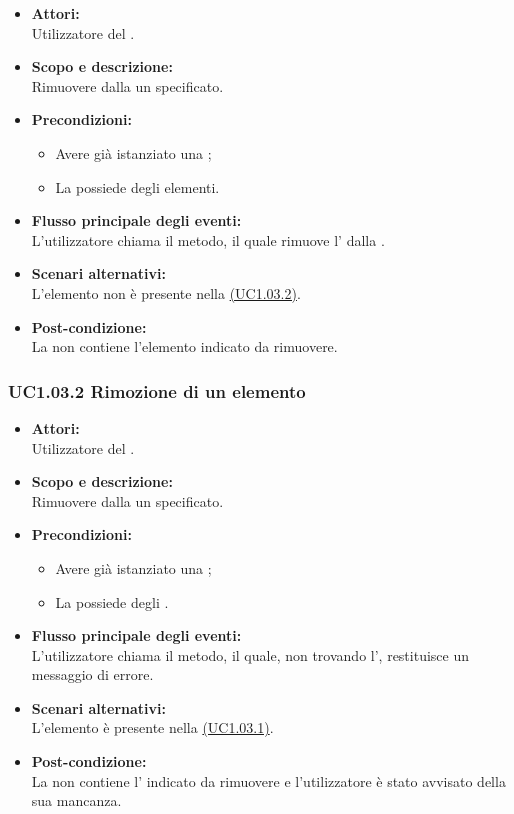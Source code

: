 \begin{itemize}
	\item \textbf{Attori:}
	\\Utilizzatore del .
	\item \textbf{Scopo e descrizione:} 
	\\Rimuovere dalla  un  specificato.
	\item \textbf{Precondizioni:}
	\begin{itemize}
		\item Avere già istanziato una ;
		\item La  possiede degli elementi.
	\end{itemize}
	\item \textbf{Flusso principale degli eventi:}
	\\L'utilizzatore chiama il metodo, il quale rimuove l' dalla .
	\item \textbf{Scenari alternativi:}
	\\L'elemento non è presente nella  \hyperref[UC1.03.2]{(UC1.03.2)}.
	\item \textbf{Post-condizione:}
	\\La {} non contiene l'elemento indicato da rimuovere.
\end{itemize}

\subsubsection{UC1.03.2 Rimozione di un elemento} \label{UC1.03.2}

\begin{itemize}
	\item \textbf{Attori:}
	\\Utilizzatore del .
	\item \textbf{Scopo e descrizione:} 
	\\Rimuovere dalla  un  specificato.
	\item \textbf{Precondizioni:}
	\begin{itemize}
		\item Avere già istanziato una ;
		\item La  possiede degli .
	\end{itemize}
	\item \textbf{Flusso principale degli eventi:}
	\\L'utilizzatore chiama il metodo, il quale, non trovando l', restituisce un messaggio di errore.
	\item \textbf{Scenari alternativi:}
	\\L'elemento è presente nella  \hyperref[UC1.03.1]{(UC1.03.1)}.
	\item \textbf{Post-condizione:}
	\\La {} non contiene l' indicato da rimuovere e l'utilizzatore è stato avvisato della sua mancanza.
\end{itemize}

